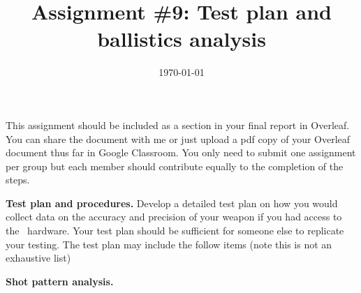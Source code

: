 \documentclass[noanswers]{exam}
\title{Assignment \#9: Test plan and ballistics analysis}
\author{\usnaAuthorShort}
\date{\today}
\begin{document}
\maketitle

This assignment should be included as a section in your final report in Overleaf.  You can share the document with me or just upload a pdf copy of your Overleaf document thus far in Google Classroom. 
You only need to submit one assignment per group but each member should contribute equally to the completion of the steps.  

\begin{questions}
\question \textbf{Test plan and procedures.} Develop a detailed test plan on how you would collect data on the accuracy and precision of your weapon if you had access to the \usnaCourseNumber\ hardware.  Your test plan should be sufficient for someone else to replicate your testing. The test plan may include the follow items (note this is not an exhaustive list)



\question \textbf{Shot pattern analysis.}
\end{questions}
\end{document}
